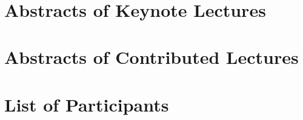 \documentclass[article,A4,11pt]{llncs}
\begin{document}
\newpage
{\ }

\tableofcontents


\part{Abstracts of Keynote Lectures}

\pagestyle{plain}

\newpage %
\newpage
\newpage %


\part{Abstracts of Contributed Lectures}

\newpage %
\newpage
\newpage
\newpage
\newpage
\newpage
\newpage
\newpage
\newpage
\newpage
\newpage
\newpage
\newpage
\newpage
\newpage
\newpage
\newpage
\newpage
\newpage
\newpage
\newpage
\newpage
\newpage
\newpage
\newpage
\newpage
\newpage
\newpage
\newpage
\newpage
\newpage
\newpage 
\newpage
\newpage
\newpage
\newpage
\newpage
\newpage
\newpage
\newpage
\newpage
\newpage


\part{List of Participants}

\end{document}
